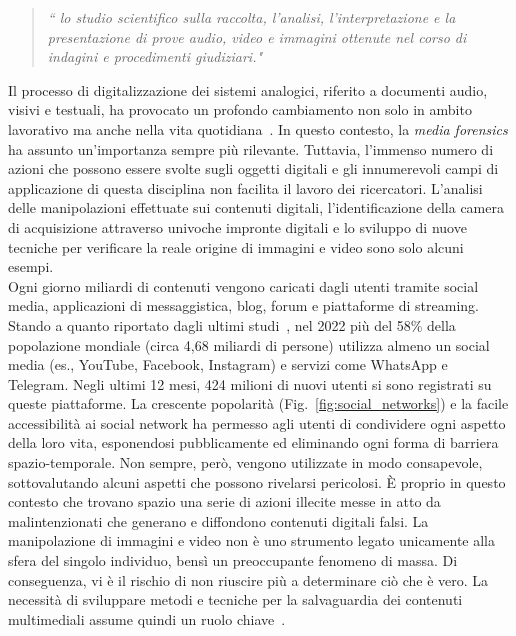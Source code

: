\begin{quote}
    \textit{“ lo studio scientifico sulla raccolta, l'analisi, l'interpretazione e la presentazione di prove audio, video e immagini ottenute nel corso di indagini e procedimenti giudiziari."}
\end{quote}
Il processo di digitalizzazione dei sistemi analogici, riferito a documenti audio, visivi e testuali, ha provocato un profondo cambiamento non solo in ambito lavorativo ma anche nella vita quotidiana~\cite{digitalizzazione}. In questo contesto, la \textit{media forensics} ha assunto un'importanza sempre più rilevante. Tuttavia, l'immenso numero di azioni che possono essere svolte sugli oggetti digitali e gli innumerevoli campi di applicazione di questa disciplina non facilita il lavoro dei ricercatori. L'analisi delle manipolazioni effettuate sui contenuti digitali, l'identificazione della camera di acquisizione attraverso univoche impronte digitali e lo sviluppo di nuove tecniche per verificare la reale origine di immagini e video sono solo alcuni esempi.\\
Ogni giorno miliardi di contenuti vengono caricati dagli utenti tramite social media, applicazioni di messaggistica, blog, forum e piattaforme di streaming. Stando a quanto riportato dagli ultimi studi~\cite{chaffey}, nel 2022 più del 58\% della popolazione mondiale (circa 4,68 miliardi di persone) utilizza almeno un social media (es., YouTube, Facebook, Instagram) e servizi come WhatsApp e Telegram. Negli ultimi 12 mesi, 424 milioni di nuovi utenti  si sono registrati su queste piattaforme. La crescente popolarità (Fig.~\ref{fig:social_networks}) e la facile accessibilità ai social network ha permesso agli utenti di condividere ogni aspetto della loro vita, esponendosi pubblicamente ed eliminando ogni forma di barriera spazio-temporale. Non sempre, però, vengono utilizzate in modo consapevole, sottovalutando alcuni aspetti che possono rivelarsi pericolosi. È proprio in questo contesto che trovano spazio una serie di azioni illecite messe in atto da malintenzionati che generano e diffondono contenuti digitali falsi. La manipolazione di immagini e video non è uno strumento legato unicamente alla sfera del singolo individuo, bensì un preoccupante fenomeno di massa. Di conseguenza, vi è il rischio di non riuscire più a determinare ciò che è vero. La necessità di sviluppare metodi e tecniche per la salvaguardia dei contenuti multimediali assume quindi un ruolo chiave~\cite{pagano}.

